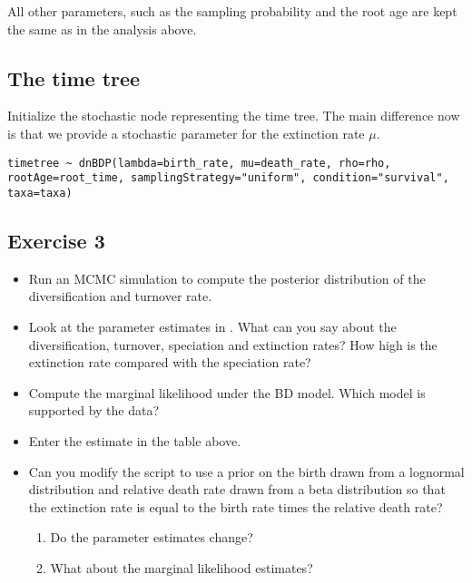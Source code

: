 All other parameters, such as the sampling probability and the root age are kept the same as in the analysis above.

\subsection{The time tree}

Initialize the stochastic node representing the time tree.
The main difference now is that we provide a stochastic parameter for the extinction rate $\mu$.
{\tt \begin{snugshade*}
\begin{lstlisting}
timetree ~ dnBDP(lambda=birth_rate, mu=death_rate, rho=rho, rootAge=root_time, samplingStrategy="uniform", condition="survival", taxa=taxa)
\end{lstlisting}
\end{snugshade*}}



\subsection{Exercise 3}

\begin{itemize}
\item Run an MCMC simulation to compute the posterior distribution of the diversification and turnover rate.
\item Look at the parameter estimates in \Tracer. What can you say about the diversification, turnover, speciation and extinction rates? How high is the extinction rate compared with the speciation rate?
\item Compute the marginal likelihood under the BD model. Which model is supported by the data?
\item Enter the estimate in the table above.
\item Can you modify the script to use a prior on the birth drawn from a lognormal distribution and relative death rate drawn from a beta distribution so that the extinction rate is equal to the birth rate times the relative death rate?
\begin{enumerate}[label=\alph*)]
\item Do the parameter estimates change?
\item What about the marginal likelihood estimates?
\end{enumerate}
\end{itemize}





